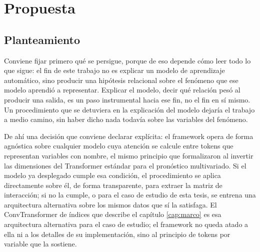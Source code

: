 
\chapter{Propuesta}
\label{cap:propuesta}

\section{Planteamiento}

Conviene fijar primero qué se persigue, porque de eso depende cómo leer todo lo que sigue: el fin de este trabajo no es explicar un modelo de aprendizaje automático, sino producir una hipótesis relacional sobre el fenómeno que ese modelo aprendió a representar. Explicar el modelo, decir qué relación pesó al producir una salida, es un paso instrumental hacia ese fin, no el fin en sí mismo. Un procedimiento que se detuviera en la explicación del modelo dejaría el trabajo a medio camino, sin haber dicho nada todavía sobre las variables del fenómeno.

De ahí una decisión que conviene declarar explícita: el framework opera de forma agnóstica sobre cualquier modelo cuya atención se calcule entre tokens que representan variables con nombre, el mismo principio que \textcite{liu2024itransformer} formalizaron al invertir las dimensiones del Transformer estándar para el pronóstico multivariado. Si el modelo ya desplegado cumple esa condición, el procedimiento se aplica directamente sobre él, de forma transparente, para extraer la matriz de interacción; si no la cumple, o para el caso de estudio de esta tesis, se entrena una arquitectura alternativa sobre los mismos datos que sí la satisfaga. El ConvTransformer de índices que describe el capítulo \ref{cap:marco} es esa arquitectura alternativa para el caso de estudio; el framework no queda atado a ella ni a los detalles de su implementación, sino al principio de tokens por variable que la sostiene.

